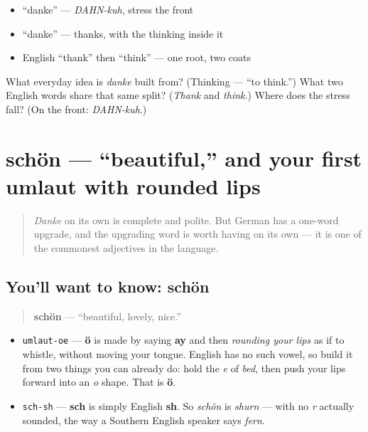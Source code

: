 \begin{itemize}
\raggedright
  \item \textquotedblleft{}danke\textquotedblright{} — \emph{DAHN-kuh}, stress the front
  \item \textquotedblleft{}danke\textquotedblright{} — thanks, with the thinking inside it
  \item English \textquotedblleft{}thank\textquotedblright{} then \textquotedblleft{}think\textquotedblright{} — one root, two coats
\end{itemize}

\begin{tcolorbox}[breakable,colback=teal!4,colframe=teal!35!black,title={Before you move on}]
What everyday idea is \emph{danke} built from? (Thinking — \textquotedblleft{}to think.\textquotedblright{}) What two English words share that same split? (\emph{Thank} and \emph{think}.) Where does the stress fall? (On the front: \emph{DAHN-kuh}.)
\end{tcolorbox}
\section[schön]{schön — \textquotedblleft{}beautiful,\textquotedblright{} and your first umlaut with rounded lips}

\label{lesson:GE-C03-schoen}



\begin{quote}
\emph{Danke} on its own is complete and polite. But German has a one-word upgrade, and the upgrading word is worth having on its own — it is one of the commonest adjectives in the language.
\end{quote}

\subsection*{You'll want to know: schön}
\begin{quote}
\textbf{schön} — \textquotedblleft{}beautiful, lovely, nice.\textquotedblright{}
\end{quote}

\begin{sounds}
\begin{itemize}
\raggedright
  \item \texttt{umlaut-oe} — \textbf{ö} is made by saying \textbf{ay} and then \emph{rounding your lips} as if to whistle, without moving your tongue. English has no such vowel, so build it from two things you can already do: hold the \emph{e} of \emph{bed}, then push your lips forward into an \emph{o} shape. That is \textbf{ö}.
  \item \texttt{sch-sh} — \textbf{sch} is simply English \textbf{sh}. So \emph{schön} is \emph{shurn} — with no \emph{r} actually sounded, the way a Southern English speaker says \emph{fern}.
\end{itemize}
\end{sounds}

